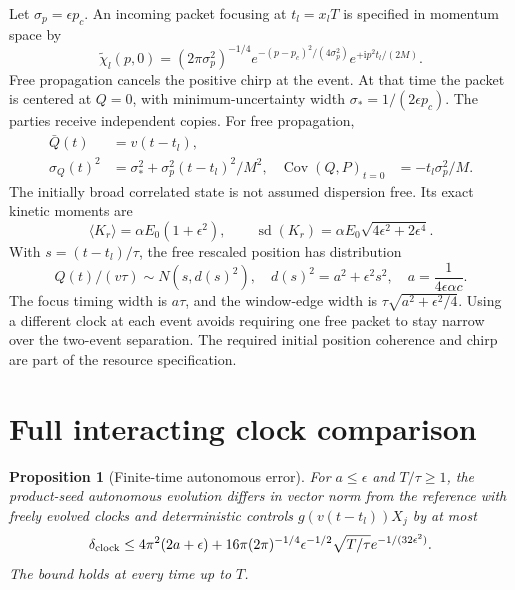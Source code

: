 \documentclass[11pt]{article}
\newtheorem{proposition}[theorem]{Proposition}
\newcommand{\sd}{\operatorname{sd}}
\newcommand{\Cov}{\operatorname{Cov}}
\newcommand{\ii}{\mathrm{i}}
\begin{document}
Let $\sigma_p=\epsilon p_c$.
An incoming packet focusing at $t_l=x_lT$ is specified in momentum space by
\begin{equation}
 \widetilde\chi_l(p,0)=(2\pi\sigma_p^2)^{-1/4}
 e^{-(p-p_c)^2/(4\sigma_p^2)}e^{+\ii p^2t_l/(2M)}.\label{eq:clockpacket}
\end{equation}
Free propagation cancels the positive chirp at the event.
At that time the packet is centered at $Q=0$, with minimum-uncertainty width $\sigma_*=1/(2\epsilon p_c)$.
The parties receive independent copies.
For free propagation,
\begin{align}
 \bar Q(t)&=v(t-t_l),\nonumber\\
 \sigma_Q(t)^2&=\sigma_*^2+\sigma_p^2(t-t_l)^2/M^2,
 &\Cov(Q,P)_{t=0}&=-t_l\sigma_p^2/M.\label{eq:clockspread}
\end{align}
The initially broad correlated state is not assumed dispersion free.
Its exact kinetic moments are
\begin{equation}
 \langle K_r\rangle=\alpha E_0(1+\epsilon^2),\qquad
 \sd(K_r)=\alpha E_0\sqrt{4\epsilon^2+2\epsilon^4}.\label{eq:clockenergy}
\end{equation}
With $s=(t-t_l)/\tau$, the free rescaled position has distribution
\begin{equation}
 Q(t)/(v\tau)\sim N(s,d(s)^2),\quad
 d(s)^2=a^2+\epsilon^2s^2,\quad a=\frac1{4\epsilon\alpha c}.\label{eq:scaledspread}
\end{equation}
The focus timing width is $a\tau$, and the window-edge width is $\tau\sqrt{a^2+\epsilon^2/4}$.
Using a different clock at each event avoids requiring one free packet to stay narrow over the two-event separation.
The required initial position coherence and chirp are part of the resource specification.

\section{Full interacting clock comparison}\label{sec:clockerror}

\begin{proposition}[Finite-time autonomous error]\label{prop:clock}
For $a\le\epsilon$ and $T/\tau\ge1$, the product-seed autonomous evolution differs in vector norm from the reference with freely evolved clocks and deterministic controls $g(v(t-t_l))X_j$ by at most
\begin{equation}
 \delta_{\rm clock}\le4\pi^2(2a+\epsilon)
 +16\pi(2\pi)^{-1/4}\epsilon^{-1/2}\sqrt{T/\tau}
 e^{-1/(32\epsilon^2)}.\label{eq:clockbound}
\end{equation}
The bound holds at every time up to $T$.
\end{proposition}
\end{document}
